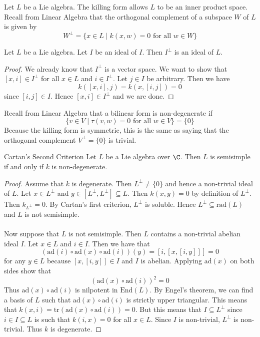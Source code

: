 \documentclass[a4paper]{article}
\begin{document}
Let $L$ be a Lie algebra. The killing form allows $L$ to be an inner product space. Recall from Linear Algebra that the orthogonal complement of a subspace $W$ of $L$ is given by $$W^\perp=\{x\in L\;|\;k(x,w)=0\text{ for all }w\in W\}$$

\begin{lmm}{}{} Let $L$ be a Lie algebra. Let $I$ be an ideal of $I$. Then $I^\perp$ is an ideal of $L$. \tcbline
\begin{proof}
We already know that $I^\perp$ is a vector space. We want to show that $[x,i]\in I^\perp$ for all $x\in L$ and $i\in I^\perp$. Let $j\in I$ be arbitrary. Then we have $$k([x,i],j)=k(x,[i,j])=0$$ since $[i,j]\in I$. Hence $[x,i]\in I^\perp$ and we are done. 
\end{proof}
\end{lmm}

Recall from Linear Algebra that a bilinear form is non-degenerate if $$\{v\in V\;|\;\tau(v,w)=0\text{ for all }w\in V\}=\{0\}$$ Because the killing form is symmetric, this is the same as saying that the orthogonal complement $V^\perp=\{0\}$ is trivial. 

\begin{thm}{Cartan's Second Criterion}{} Let $L$ be a Lie algebra over $\C$. Then $L$ is semisimple if and only if $k$ is non-degenerate. \tcbline
\begin{proof}
Assume that $k$ is degenerate. Then $L^\perp\neq\{0\}$ and hence a non-trivial ideal of $L$. Let $x\in L^\perp$ and $y\in[L^\perp,L^\perp]\subseteq L$. Then $k(x,y)=0$ by definition of $L^\perp$. Then $k_{L^\perp}=0$. By Cartan's first criterion, $L^\perp$ is soluble. Hence $L^\perp\subseteq\text{rad}(L)$ and $L$ is not semisimple. \\~\\

Now suppose that $L$ is not semisimple. Then $L$ contains a non-trivial abelian ideal $I$. Let $x\in L$ and $i\in I$. Then we have that $$\left(\text{ad}(i)\circ\text{ad}(x)\circ\text{ad}(i)\right)(y)=[i,[x,[i,y]]]=0$$ for any $y\in L$ because $[x,[i,y]]\in I$ and $I$ is abelian. Applying $\text{ad}(x)$ on both sides show that $$\left(\text{ad}(x)\circ\text{ad}(i)\right)^2=0$$ Thus $\text{ad}(x)\circ\text{ad}(i)$ is nilpotent in $\text{End}(L)$. By Engel's theorem, we can find a basis of $L$ such that $\text{ad}(x)\circ\text{ad}(i)$ is strictly upper triangular. This means that $k(x,i)=\text{tr}(\text{ad}(x)\circ\text{ad}(i))=0$. But this means that $I\subseteq L^\perp$ since $i\in I\subseteq L$ is such that $k(i,x)=0$ for all $x\in L$. Since $I$ is non-trivial, $L^\perp$ is non-trivial. Thus $k$ is degenerate. 
\end{proof}
\end{thm}
\end{document}
